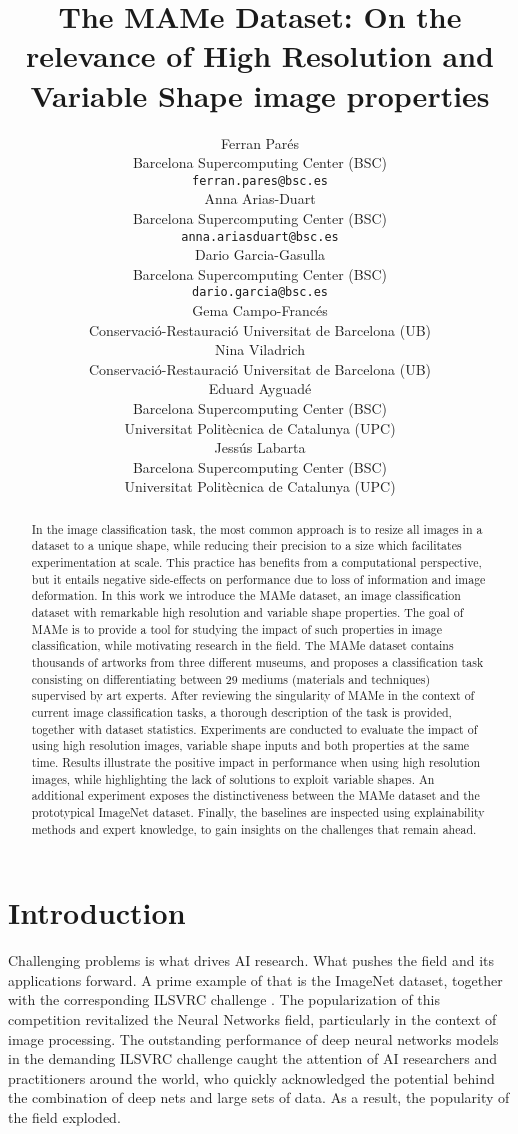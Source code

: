 \documentclass{article}
\title{The MAMe Dataset: On the relevance of High Resolution and Variable Shape image properties}
\author{Ferran Parés \\
	Barcelona Supercomputing Center (BSC) \\
	\texttt{ferran.pares@bsc.es} \\
	\And
	Anna Arias-Duart \\
	Barcelona Supercomputing Center (BSC) \\
	\texttt{anna.ariasduart@bsc.es} \\
	\And
	Dario Garcia-Gasulla \\
	Barcelona Supercomputing Center (BSC) \\
	\texttt{dario.garcia@bsc.es} \\
	\And
	Gema Campo-Francés \\
	Conservació-Restauració Universitat de Barcelona (UB) \\
	\And
	Nina Viladrich \\
	Conservació-Restauració Universitat de Barcelona (UB) \\
	\And
	Eduard Ayguadé \\
	Barcelona Supercomputing Center (BSC) \\
	Universitat Politècnica de Catalunya (UPC) \\
	\And
	Jessús Labarta \\
	Barcelona Supercomputing Center (BSC) \\
	Universitat Politècnica de Catalunya (UPC) \\
}
\date{}
\begin{document}
\maketitle

\begin{abstract}
In the image classification task, the most common approach is to resize all images in a dataset to a unique shape, while reducing their precision to a size which facilitates experimentation at scale. This practice has benefits from a computational perspective, but it entails negative side-effects on performance due to loss of information and image deformation. In this work we introduce the MAMe dataset, an image classification dataset with remarkable high resolution and variable shape properties. The goal of MAMe is to provide a tool for studying the impact of such properties in image classification, while motivating research in the field. The MAMe dataset contains thousands of artworks from three different museums, and proposes a classification task consisting on differentiating between 29 mediums (\ie materials and techniques) supervised by art experts. After reviewing the singularity of MAMe in the context of current image classification tasks, a thorough description of the task is provided, together with dataset statistics. Experiments are conducted to evaluate the impact of using high resolution images, variable shape inputs and both properties at the same time. Results illustrate the positive impact in performance when using high resolution images, while highlighting the lack of solutions to exploit variable shapes. An additional experiment exposes the distinctiveness between the MAMe dataset and the prototypical ImageNet dataset. Finally, the baselines are inspected using explainability methods and expert knowledge, to gain insights on the challenges that remain ahead.
\end{abstract}


\section{Introduction}\label{sec:i}

Challenging problems is what drives AI research. What pushes the field and its applications forward. A prime example of that is the ImageNet dataset, together with the corresponding ILSVRC challenge \citep{russakovsky2015imagenet}. The popularization of this competition revitalized the Neural Networks field, particularly in the context of image processing. The outstanding performance of deep neural networks models in the demanding ILSVRC challenge caught the attention of AI researchers and practitioners around the world, who quickly acknowledged the potential behind the combination of deep nets and large sets of data. As a result, the popularity of the field exploded.
\end{document}
